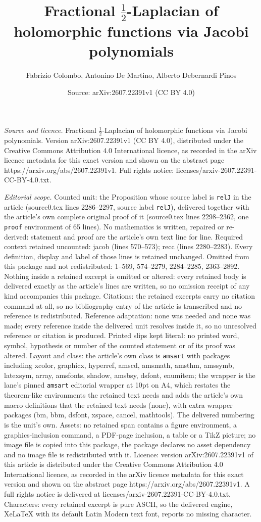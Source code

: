 \documentclass[10pt,a4paper]{amsart}
\title[Fractional $\frac{1}{2}$-Laplacian of holomorphic functions ]{Fractional $\frac{1}{2}$-Laplacian of holomorphic functions via Jacobi polynomials}
\author{Fabrizio Colombo, Antonino De Martino, Alberto Debernardi Pinos}
\date{Source: arXiv:2607.22391v1 (CC BY 4.0)}
\begin{document}
\maketitle

\noindent\emph{Source and licence.} Fractional $\frac{1}{2}$-Laplacian of holomorphic functions via Jacobi polynomials. Version arXiv:2607.22391v1 (CC BY 4.0), distributed under the Creative Commons Attribution 4.0 International licence, as recorded in the arXiv licence metadata for this exact version and shown on the abstract page https://arxiv.org/abs/2607.22391v1. Full rights notice: licenses/arxiv-2607.22391-CC-BY-4.0.txt.\par\smallskip

\noindent\textit{Editorial scope.} Counted unit: the Proposition whose source label is \texttt{relJ} in the article (source0.tex lines 2286--2297, source label \texttt{relJ}), delivered together with the article's own complete original proof of it (source0.tex lines 2298--2362, one \texttt{proof} environment of 65 lines). No mathematics is written, repaired or re-derived: statement and proof are the article's own text line for line. Required context retained uncounted: jacob (lines 570--573); recc (lines 2280--2283). Every definition, display and label of those lines is retained unchanged. Omitted from this package and not redistributed: 1--569, 574--2279, 2284--2285, 2363--2892. Nothing inside a retained excerpt is omitted or altered: every retained body is delivered exactly as the article's lines are written, so no omission receipt of any kind accompanies this package. Citations: the retained excerpts carry no citation command at all, so no bibliography entry of the article is transcribed and no reference is redistributed. Reference adaptation: none was needed and none was made; every reference inside the delivered unit resolves inside it, so no unresolved reference or citation is produced. Printed slips kept literal: no printed word, symbol, hypothesis or number of the counted statement or of its proof was altered. Layout and class: the article's own class is \texttt{amsart} with packages including xcolor, graphicx, hyperref, amscd, amsmath, amsthm, amssymb, latexsym, array, amsfonts, shadow, amsbsy, dsfont, enumitem; the wrapper is the lane's pinned \texttt{amsart} editorial wrapper at 10pt on A4, which restates the theorem-like environments the retained text needs and adds the article's own macro definitions that the retained text needs (none), with extra wrapper packages (bm, bbm, dsfont, xspace, cancel, mathtools). The delivered numbering is the unit's own. Assets: no retained span contains a figure environment, a graphics-inclusion command, a PDF-page inclusion, a table or a TikZ picture; no image file is copied into this package, the package declares no asset dependency and no image file is redistributed with it. Licence: version arXiv:2607.22391v1 of this article is distributed under the Creative Commons Attribution 4.0 International licence, as recorded in the arXiv licence metadata for this exact version and shown on the abstract page https://arxiv.org/abs/2607.22391v1. A full rights notice is delivered at licenses/arxiv-2607.22391-CC-BY-4.0.txt. Characters: every retained excerpt is pure ASCII, so the delivered engine, XeLaTeX with its default Latin Modern text font, reports no missing character.
\end{document}
